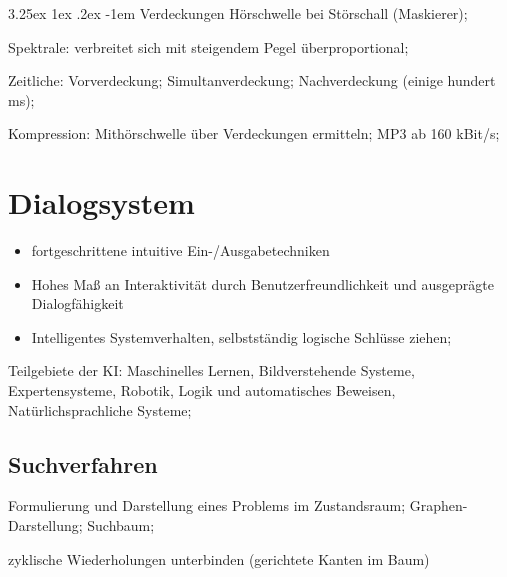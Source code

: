 \documentclass[german,color,6pt]{latex4ei/latex4ei_sheet}
\makeatletter
\renewcommand\paragraph{\@startsection{paragraph}{4}{\z@}%
                                    {3.25ex \@plus1ex \@minus.2ex}%
                                    {-1em}%
                                    {\normalfont\normalsize\bfseries}}
\makeatother
\begin{document}
\begin{sectionbox}
\paragraph{Verdeckungen} Hörschwelle bei Störschall (Maskierer); 

Spektrale: verbreitet sich mit steigendem Pegel überproportional; 

Zeitliche: Vorverdeckung; Simultanverdeckung; Nachverdeckung (einige hundert ms); 

Kompression: Mithörschwelle über Verdeckungen ermitteln; MP3 ab 160 kBit/s; 
\end{sectionbox}

\section{Dialogsystem}
\begin{symbolbox}
\begin{itemize}
	\item fortgeschrittene intuitive Ein-/Ausgabetechniken 
	\item Hohes Maß an Interaktivität durch Benutzerfreundlichkeit und ausgeprägte Dialogfähigkeit
	\item Intelligentes Systemverhalten, selbstständig logische Schlüsse ziehen; 
\end{itemize}
\end{symbolbox}
Teilgebiete der KI: Maschinelles Lernen, Bildverstehende Systeme, Expertensysteme, Robotik, Logik und automatisches Beweisen, Natürlichsprachliche Systeme; 

\subsection{Suchverfahren}
\begin{symbolbox}
Formulierung und Darstellung eines Problems im Zustandsraum; Graphen-Darstellung; Suchbaum;
\end{symbolbox}

\begin{emphbox}
 zyklische Wiederholungen unterbinden (gerichtete Kanten im Baum)
\end{emphbox}
\end{document}
